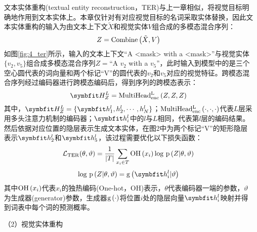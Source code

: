 
文本实体重构(textual entity reconstruction，TER)与上一章相似，将视觉目标明确地作用到文本实体上。本章仅针对有对应视觉目标的名词采取实体替换，因此文本实体重构的输入为由文本上下文$\tilde{X}$和视觉实体$V$组合成的多模态混合序列：
\begin{equation}
Z={\rm{Combine}} \left( \tilde{X}, V \right)
\end{equation}
如图\ref{fig:4_ter}所示，输入的文本上下文“A <mask> with a <mask>”与视觉实体$\{v_2,v_5\}$组合成多模态混合序列$Z=$“A $v_2$ with a $v_5$”，此时输入到模型中的是三个空心圆代表的词向量和两个标记“V”的圆代表的$v_2$和$v_5$对应的视觉特征。跨模态混合序列经过编码器进行跨模态编码后，得到序列的跨模态表示：
\begin{equation}
\Vector{H_Z^L}={\rm{MultiHead_{enc}^L}} \left( Z, Z, Z \right)
\end{equation}
其中，$\Vector{H_Z^L}=\{\Vector{h_1^l,h_2^l,\cdots,h_N^l}\}$；${\rm{MultiHead_{enc}^L}} \left( \cdot,\cdot,\cdot \right)$代表$L$层采用多头注意力机制的编码器；$\Vector{h_i^l}$中的$l$与$L$相同，代表第$l$层的编码结果。然后依据对应位置的隐层表示生成文本实体，在图2中为两个标记“V”的矩形隐层表示${\Vector{h_2^l}}$和${\Vector{h_5^l}}$，该过程需要优化以下损失函数：
\begin{equation}
\mathcal{L}_{\rm{TER}} (\theta, \vartheta) =
    \frac{1}{{\vert}T{\vert}}
    \mathop{\sum}_{x_i \in T}
    {\rm{OH}} \left( x_i \right)
    {\rm log}{\ }{\rm p} \left( Z {\vert} \theta, \vartheta \right)
\end{equation}
\begin{equation}
{\log}{\ }{\rm p} \left( Z {\vert} \theta, \vartheta \right) =
    {\rm{g}} \left( \Vector{h_i^l} \vert \vartheta \right)
\end{equation}
其中${\rm{OH}}\left(x_i\right)$代表$x_i$的独热编码(One-hot，OH)表示，$\theta$代表编码器一端的参数，$\vartheta$为生成器(generator)参数，生成器${\rm{g}}\left(\cdot\right)$将位置$i$处的隐层向量${\Vector{h_i^l}}$映射并得到词表中每个词的预测概率。

{\sffamily （2）视觉实体重构}

